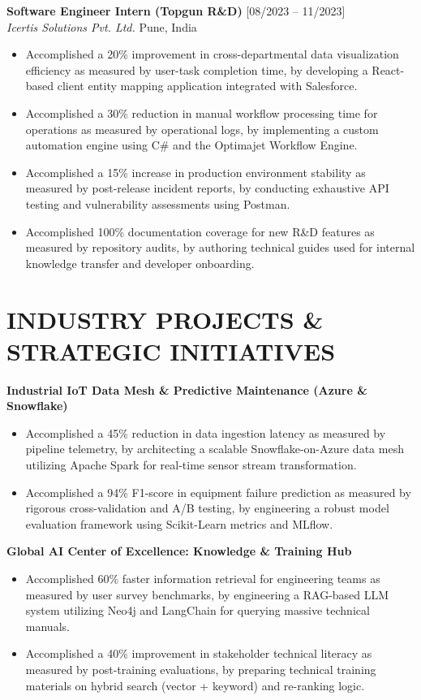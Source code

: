\documentclass[10pt, a4paper]{article}
\begin{document}
\vspace{6pt}
\noindent
\textbf{Software Engineer Intern (Topgun R\&D)} \hfill [08/2023 -- 11/2023] \\
\textit{Icertis Solutions Pvt. Ltd.} \hfill Pune, India
\begin{itemize}
    \item Accomplished a 20\% improvement in cross-departmental data visualization efficiency as measured by user-task completion time, by developing a React-based client entity mapping application integrated with Salesforce.
    \item Accomplished a 30\% reduction in manual workflow processing time for operations as measured by operational logs, by implementing a custom automation engine using C\# and the Optimajet Workflow Engine.
    \item Accomplished a 15\% increase in production environment stability as measured by post-release incident reports, by conducting exhaustive API testing and vulnerability assessments using Postman.
    \item Accomplished 100\% documentation coverage for new R\&D features as measured by repository audits, by authoring technical guides used for internal knowledge transfer and developer onboarding.
\end{itemize}

\section{INDUSTRY PROJECTS \& STRATEGIC INITIATIVES}

\noindent
\textbf{Industrial IoT Data Mesh \& Predictive Maintenance (Azure \& Snowflake)}
\begin{itemize}
    \item Accomplished a 45\% reduction in data ingestion latency as measured by pipeline telemetry, by architecting a scalable Snowflake-on-Azure data mesh utilizing Apache Spark for real-time sensor stream transformation.
    \item Accomplished a 94\% F1-score in equipment failure prediction as measured by rigorous cross-validation and A/B testing, by engineering a robust model evaluation framework using Scikit-Learn metrics and MLflow.
\end{itemize}

\vspace{4pt}
\noindent
\textbf{Global AI Center of Excellence: Knowledge & Training Hub}
\begin{itemize}
    \item Accomplished 60\% faster information retrieval for engineering teams as measured by user survey benchmarks, by engineering a RAG-based LLM system utilizing Neo4j and LangChain for querying massive technical manuals.
    \item Accomplished a 40\% improvement in stakeholder technical literacy as measured by post-training evaluations, by preparing technical training materials on hybrid search (vector + keyword) and re-ranking logic.
\end{itemize}
\end{document}

